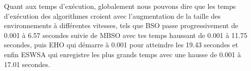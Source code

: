 	Quant aux temps d'exécution, globalement nous pouvons dire que les temps d'exécution des algorithmes croient avec l'augmentation de la taille des environnements à différentes vitesses, tels que BSO passe progressivement de 0.001 à 6.57 secondes suivie de MBSO avec tes temps haussant de 0.001 à 11.75 secondes, puis EHO qui démarre à 0.001 pour atteindre les 19.43 secondes et enfin ESWSA qui enregistre les plus grands temps avec une hausse de  0.001 à 17.01 secondes.



\noindent
\begin{minipage}[t]{0.55\textwidth}
	\hspace{-0.5cm}
	\captionsetup{width=0.8\linewidth}
	\centering{}
	\label{IS5}
\end{minipage}\hfill
\hspace{-0.5cm}
\begin{minipage}[t]{0.55\textwidth}
	\captionsetup{width=0.8\linewidth}
	\centering{}
	\label{tS5}
\end{minipage}\hfill




